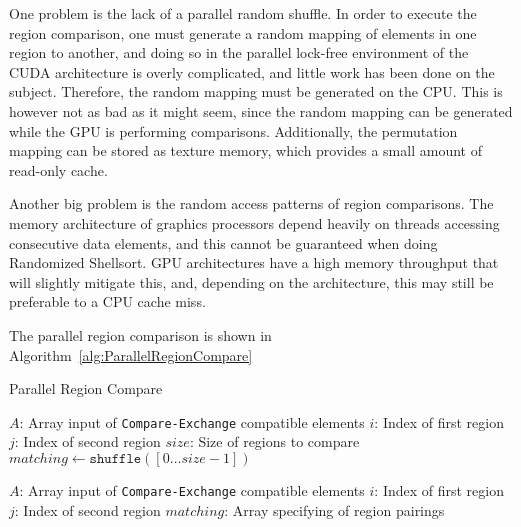 One problem is the lack of a parallel random shuffle. In order to execute the region comparison, one must generate a random mapping of elements in one region to another, and doing so in the parallel lock-free environment of the CUDA architecture is overly complicated, and little work has been done on the subject. Therefore, the random mapping must be generated on the CPU. This is however not as bad as it might seem, since the random mapping can be generated while the GPU is performing comparisons. Additionally, the permutation mapping can be stored as texture memory, which provides a small amount of read-only cache.

Another big problem is the random access patterns of region comparisons. The memory architecture of graphics processors depend heavily on threads accessing consecutive data elements, and this cannot be guaranteed when doing Randomized Shellsort. GPU architectures have a high memory throughput that will slightly mitigate this, and, depending on the architecture, this may still be preferable to a CPU cache miss. 

The parallel region comparison is shown in Algorithm~\ref{alg:ParallelRegionCompare}

\begin{algorithm}
\caption{Parallel Region Compare}\label{alg:ParallelRegionCompare}
\begin{algorithmic}[1]
	\Statex $A$: Array input of \texttt{Compare-Exchange} compatible elements
	\Statex $i$: Index of first region
	\Statex $j$: Index of second region
	\Statex $size$: Size of regions to compare
	\State $matching \gets \mathtt{shuffle}([0 \dots size-1])$
\EndFor
\EndProcedure

\item[]

	\Statex $A$: Array input of \texttt{Compare-Exchange} compatible elements
	\Statex $i$: Index of first region
	\Statex $j$: Index of second region
	\Statex $matching$: Array specifying of region pairings
\EndProcedure
\end{algorithmic}
\end{algorithm}